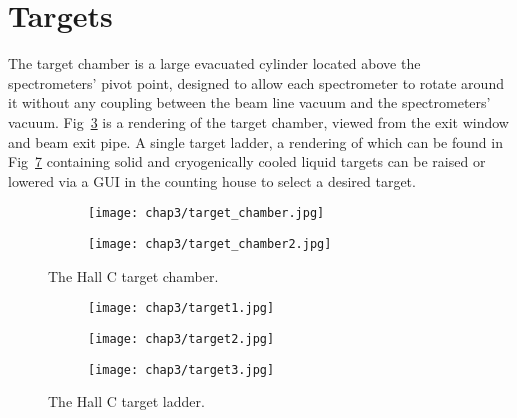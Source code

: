 \section{Targets}
The target chamber is a large evacuated cylinder located above the
spectrometers' pivot point, designed to allow each spectrometer to rotate
around it without any coupling between the beam line vacuum and the
spectrometers' vacuum.
Fig~\ref{fig:target_chamber} is a rendering of the target chamber, viewed
from the exit window and beam exit pipe.
A single target ladder, a rendering of which can be found in
Fig~\ref{fig:target_ladder} containing solid and cryogenically cooled liquid
targets can be raised or lowered via a GUI in the counting house to select a
desired target.

\begin{figure}[h]
    \centering
    \begin{subfigure}[b]{0.4\textwidth}
        \centering
        \texttt{[image: chap3/target\_chamber.jpg]}
        \label{fig:target_chamber1}
    \end{subfigure}
    \begin{subfigure}[b]{0.4\textwidth}
        \centering
        \texttt{[image: chap3/target\_chamber2.jpg]}
        \label{fig:target_chamber2}
    \end{subfigure}
    \caption{The Hall  C target chamber.
             }
    \label{fig:target_chamber}
\end{figure}

\begin{figure}[h]
    \centering
    \begin{subfigure}[t]{0.3\textwidth}
        \centering
        \texttt{[image: chap3/target1.jpg]}
        \label{fig:target_ladder1}
    \end{subfigure}
    \hfill
    \begin{subfigure}[t]{0.3\textwidth}
        \centering
        \texttt{[image: chap3/target2.jpg]}
        \label{fig:target_ladder2}
    \end{subfigure}
    \hfill
    \begin{subfigure}[t]{0.3\textwidth}
        \centering
        \texttt{[image: chap3/target3.jpg]}
        \label{fig:target_ladder3}
    \end{subfigure}
    \caption{The Hall C target ladder.
             }
    \label{fig:target_ladder}
\end{figure}


